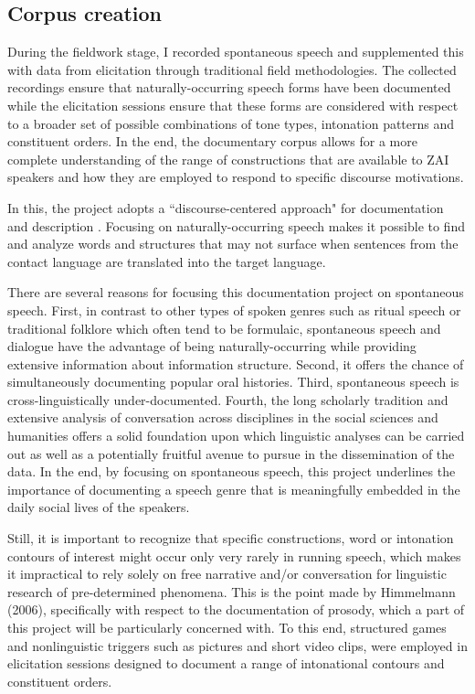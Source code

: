 \subsection{Corpus creation}

During the fieldwork stage, I recorded spontaneous speech and supplemented this with data from elicitation through traditional field methodologies. The collected recordings ensure that naturally-occurring speech forms have been documented while the elicitation sessions  ensure that these forms are considered with respect to a broader set of possible combinations of tone types, intonation patterns and constituent orders. In the end, the documentary corpus allows for a more complete understanding of the range of constructions that are available to ZAI speakers and how they are employed to respond to specific discourse motivations.

In this, the project adopts a ``discourse-centered approach" for documentation and description \citep{sherzer1987}. Focusing on naturally-occurring speech makes it possible to find and analyze words and structures that may not surface when sentences from the contact language are translated into the target language. 

There are several reasons for focusing this documentation project on spontaneous speech. First, in contrast to other types of spoken genres such as ritual speech or traditional folklore which often tend to be formulaic, spontaneous speech and dialogue have the advantage of being naturally-occurring while providing extensive information about information structure. Second, it offers the chance of simultaneously documenting popular oral histories. Third, spontaneous speech is cross-linguistically under-documented. Fourth, the long scholarly tradition and extensive analysis of conversation across disciplines in the social sciences and humanities offers a solid foundation upon which linguistic analyses can be carried out as well as a potentially fruitful avenue to pursue in the dissemination of the data. In the end, by focusing on spontaneous speech, this project underlines the importance of documenting a speech genre that is meaningfully embedded in the daily social lives of the speakers. 

Still, it is important to recognize that specific constructions, word or intonation contours of interest might occur only very rarely in running speech, which makes it impractical to rely solely on free narrative and/or conversation for linguistic research of pre-determined phenomena. This is the point made by Himmelmann (2006), specifically with respect to the documentation of prosody, which a part of this project will be particularly concerned with. To this end, structured games and nonlinguistic triggers such as pictures and short video clips, were employed in elicitation sessions designed to document a range of intonational contours and constituent orders.


